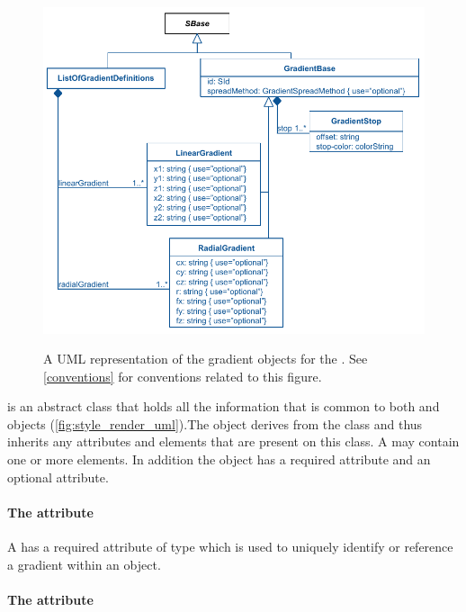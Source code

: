 \begin{figure}[!ht]
  \centering
  \includegraphics{images/render-gradient-definitions-uml}\\
  \caption{A UML representation of the gradient objects for the \RenderPackage.  See \ref{conventions} for conventions related to this figure. }
  \label{fig:gradient_render_uml}
\end{figure}


\GradientBase is an abstract class that holds all the information that is common to both \RadialGradient and \LinearGradient objects (\ref{fig:style_render_uml}).The \GradientBase object derives from the \SBase class and thus inherits
any attributes and elements that are present on this class.
A \GradientBase may contain one or more \GradientStop elements.
In addition the \GradientBase object has a required  attribute and an optional  attribute.

\paragraph{The \fixttspace{} attribute}

A \GradientBase has a required attribute  of type
 which is used to uniquely identify or reference a gradient within an \RenderInformation object.

\paragraph{The \fixttspace{} attribute}

